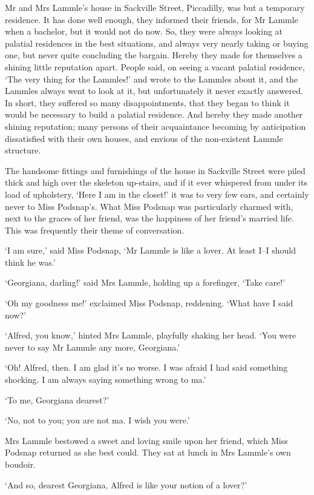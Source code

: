 Mr and Mrs Lammle’s house in Sackville Street, Piccadilly, was but
a temporary residence. It has done well enough, they informed their
friends, for Mr Lammle when a bachelor, but it would not do now. So,
they were always looking at palatial residences in the best situations,
and always very nearly taking or buying one, but never quite concluding
the bargain. Hereby they made for themselves a shining little reputation
apart. People said, on seeing a vacant palatial residence, ‘The very
thing for the Lammles!’ and wrote to the Lammles about it, and the
Lammles always went to look at it, but unfortunately it never exactly
answered. In short, they suffered so many disappointments, that they
began to think it would be necessary to build a palatial residence.
And hereby they made another shining reputation; many persons of their
acquaintance becoming by anticipation dissatisfied with their own
houses, and envious of the non-existent Lammle structure.

The handsome fittings and furnishings of the house in Sackville Street
were piled thick and high over the skeleton up-stairs, and if it ever
whispered from under its load of upholstery, ‘Here I am in the closet!’
it was to very few ears, and certainly never to Miss Podsnap’s. What
Miss Podsnap was particularly charmed with, next to the graces of
her friend, was the happiness of her friend’s married life. This was
frequently their theme of conversation.

‘I am sure,’ said Miss Podsnap, ‘Mr Lammle is like a lover. At least
I--I should think he was.’

‘Georgiana, darling!’ said Mrs Lammle, holding up a forefinger, ‘Take
care!’

‘Oh my goodness me!’ exclaimed Miss Podsnap, reddening. ‘What have I
said now?’

‘Alfred, you know,’ hinted Mrs Lammle, playfully shaking her head. ‘You
were never to say Mr Lammle any more, Georgiana.’

‘Oh! Alfred, then. I am glad it’s no worse. I was afraid I had said
something shocking. I am always saying something wrong to ma.’

‘To me, Georgiana dearest?’

‘No, not to you; you are not ma. I wish you were.’

Mrs Lammle bestowed a sweet and loving smile upon her friend, which Miss
Podsnap returned as she best could. They sat at lunch in Mrs Lammle’s
own boudoir.

‘And so, dearest Georgiana, Alfred is like your notion of a lover?’

